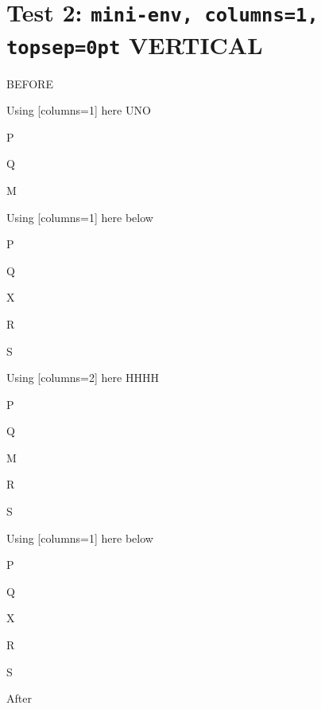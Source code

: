 \documentclass[12pt]{article}
\begin{document}
\section{Test 2: \texttt{mini-env, columns=1, topsep=0pt} VERTICAL}

BEFORE
\begin{enumext}[columns=2]
\item Using [columns=1] here UNO

  \begin{enumext}[columns=1,topsep=0pt]%
     \item  P \item Q \item M%
  \end{enumext}

\item Using [columns=1] here below

\begin{enumext}[columns=1]%
     \item  P \item Q \item X  \item R \item S
  \end{enumext}

\columnbreak

\item Using [columns=2] here HHHH

  \begin{enumext}[columns=2,topsep=0pt]%
    \item  P \item Q \item M \item R \item S
  \end{enumext}

\item Using [columns=1] here below

\begin{enumext}[columns=1]%
     \item  P \item Q \item X  \item R \item S
  \end{enumext}

\end{enumext}
After
\end{document}

